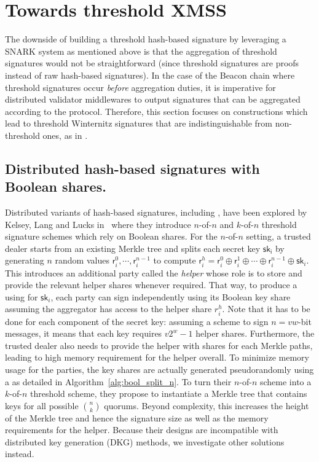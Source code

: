 \section{Towards threshold XMSS}
The downside of building a threshold hash-based signature by leveraging a SNARK system as mentioned above is that the aggregation of threshold signatures would not be straightforward (since threshold signatures are proofs instead of raw hash-based signatures).
In the case of the Beacon chain where threshold signatures occur \textit{before} aggregation duties, it is imperative for distributed validator middlewares to output signatures that can be aggregated according to the protocol.
Therefore, this section focuses on constructions which lead to threshold Winternitz signatures that are indistinguishable from non-threshold ones, as in \BLS.
\subsection{Distributed hash-based signatures with Boolean shares.}
Distributed variants of hash-based signatures, including \XMSS, have been explored by Kelsey, Lang and Lucks in~\cite{cryptoeprint:2022/241} where they introduce $n$-of-$n$ and $k$-of-$n$ threshold signature schemes which rely on Boolean shares.
For the $n$-of-$n$ setting, a trusted dealer starts from an existing Merkle tree and splits each \WOTS secret key $\mathsf{sk_i}$ by generating $n$ random values $\mathsf{r}^0_i,\cdots,\mathsf{r}^{n-1}_i$ to compute $\mathsf{r}^h_i = \mathsf{r}^0_i \oplus \mathsf{r}^1_i \oplus \cdots \oplus \mathsf{r}^{n-1}_i \oplus \mathsf{sk}_i$.
This introduces an additional party called the \textit{helper} whose role is to store and provide the relevant helper shares whenever required.
That way, to produce a \WOTS using for $\mathsf{sk}_i$, each party can sign independently using its Boolean key share assuming the aggregator has access to the helper share $r^h_i$.
Note that it has to be done for each component of the secret key: assuming a \WOTS scheme to sign $n=vw$-bit messages, it means that each \WOTS key requires $v2^w-1$ helper shares.
Furthermore, the trusted dealer also needs to provide the helper with  shares for each Merkle paths, leading to high memory requirement for the helper overall.
To minimize memory usage for the parties, the key shares are actually generated pseudorandomly using a \PRF as detailed in Algorithm~\ref{alg:bool_split_n}.
To turn their $n$-of-$n$ scheme into a $k$-of-$n$ threshold scheme, they propose to instantiate a Merkle tree that contains keys for all possible $\binom{n}{k}$ quorums.
Beyond complexity, this increases the height of the Merkle tree and hence the signature size as well as the memory requirements for the helper.
Because their designs are incompatible with distributed key generation (DKG) methods, we investigate other solutions instead. 

